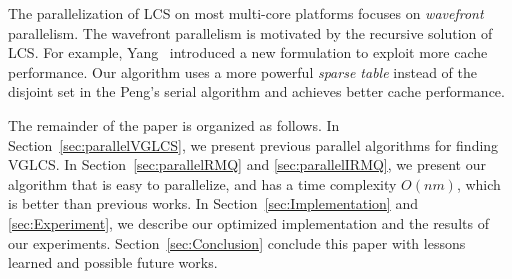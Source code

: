 
The parallelization of LCS on most multi-core platforms focuses on
{\em wavefront} parallelism.  The wavefront parallelism is motivated
by the recursive solution of LCS.  For example,
Yang~\cite{Yang2010AnEP} introduced a new formulation to exploit more
cache performance.  Our algorithm uses a more powerful {\em sparse
  table} instead of the disjoint set in the Peng's serial algorithm
and achieves better cache performance.


The remainder of the paper is organized as follows.  In
Section~\ref{sec:parallelVGLCS}, we present previous parallel
algorithms for finding VGLCS.  In Section~\ref{sec:parallelRMQ} and
\ref{sec:parallelIRMQ}, we present our algorithm that is easy to
parallelize, and has a time complexity $O(nm)$, which is better than
previous works.  In Section~\ref{sec:Implementation} and
\ref{sec:Experiment}, we describe our optimized implementation and the
results of our experiments.  Section~\ref{sec:Conclusion} conclude
this paper with lessons learned and possible future works.


